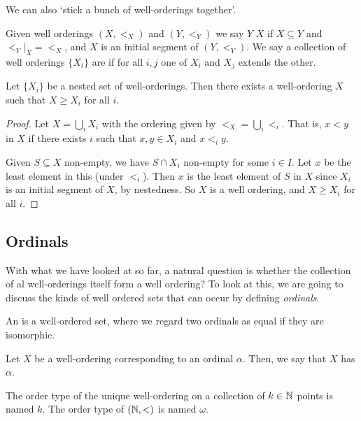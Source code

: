 \documentclass[a4paper]{scrartcl}
\begin{document}
We can also `stick a bunch of well-orderings together'.

\begin{definition}
  Given well orderings $(X, <_X)$ and $(Y, <_Y)$ we say $Y$  $X$ if $X \subseteq Y$ and $\left.<_Y\right|_X = <_X$, and $X$ is an initial segment of $(Y, <_Y)$. 
We say a collection of well orderings $\{X_i\}$ are  if for all $i, j$ one of $X_i$ and $X_j$ extends the other.
\end{definition}

\begin{proposition}
  Let $\{X_i\}$ be a nested set of well-orderings. Then there exists a well-ordering $X$ such that $X \geq X_i$ for all $i$.
\end{proposition}
\begin{proof}
  Let $X = \bigcup_i X_i$ with the ordering given by $<_X = \bigcup_i <_i$. That is, $x < y$ in $X$ if there exists $i$ such that $x, y \in X_i$ and $x <_i y$.

  Given $S \subseteq X$ non-empty, we have $S \cap X_i$ non-empty for some $i\in I$. Let $x$ be the least element in this (under $<_i$). Then $x$ is the least element of $S$ in $X$ since $X_i$ is an initial segment of $X$, by nestedness. So $X$ is a well ordering, and $X \geq X_i$ for all $i$.
\end{proof}



\subsection{Ordinals}

With what we have looked at so far, a natural question is whether the collection of al well-orderings itself form a well ordering? To look at this, we are going to discuss the kinds of well ordered sets that can occur by defining \emph{ordinals}.

\begin{definition}[Ordinal]
  An  is a well-ordered set, where we regard two ordinals as equal if they are isomorphic.
\end{definition}

\begin{definition}
  Let $X$ be a well-ordering corresponding to an ordinal $\alpha$. Then, we say that $X$ has  $\alpha$.
\end{definition}

The order type of the unique well-ordering on a collection of $k \in \mathbb{N}$ points is named $k$. The order type of $(\mathbb{N}, <)$ is named $\omega$. 
\end{document}
